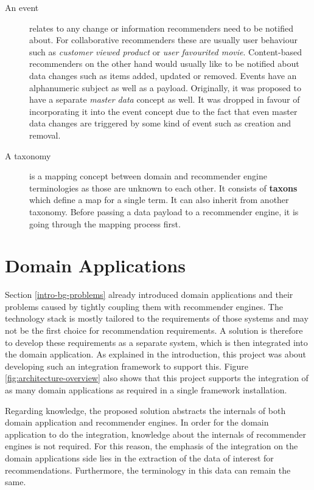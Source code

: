 \begin{description}
\item[\textnormal{An} event] relates to any change or information recommenders need to be notified about. For collaborative recommenders these are usually user behaviour such as \emph{customer viewed product} or \emph{user favourited movie}. Content-based recommenders on the other hand would usually like to be notified about data changes such as items added, updated or removed. Events have an alphanumeric subject as well as a payload. Originally, it was proposed to have a separate \emph{master data} concept as well. It was dropped in favour of incorporating it into the event concept due to the fact that even master data changes are triggered by some kind of event such as creation and removal.

\item[\textnormal{A} taxonomy] is a mapping concept between domain and recommender engine terminologies as those are unknown to each other. It consists of \textbf{taxons} which define a map for a single term. It can also inherit from another taxonomy. Before passing a data payload to a recommender engine, it is going through the mapping process first.

\end{description}

\section{Domain Applications}
\label{architecture-domain-applications}

Section \ref{intro-bg-problems} already introduced domain applications and their problems caused by tightly coupling them with recommender engines. The technology stack is mostly tailored to the requirements of those systems and may not be the first choice for recommendation requirements. A solution is therefore to develop these requirements as a separate system, which is then integrated into the domain application. As explained in the introduction, this project was about developing such an integration framework to support this. Figure \ref{fig:architecture-overview} also shows that this project supports the integration of as many domain applications as required in a single framework installation.

Regarding knowledge, the proposed solution abstracts the internals of both domain application and recommender engines. In order for the domain application to do the integration, knowledge about the internals of recommender engines is not required. For this reason, the emphasis of the integration on the domain applications side lies in the extraction of the data of interest for recommendations. Furthermore, the terminology in this data can remain the same.

